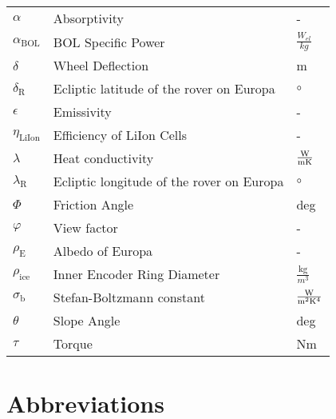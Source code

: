 \begin{longtable}[l]{lll}

$\alpha$				&	Absorptivity								& -  							\\
$\alpha_\text{BOL}$		&	BOL Specific Power							& $\frac{W_{el}}{kg}$			\\
\(\delta\)				&	Wheel Deflection							& m								\\
$\delta_\text{R}$		&	Ecliptic latitude of the rover on Europa	& $\circ$						\\
\(\epsilon\)			&	Emissivity 									&	-							\\
$\eta_\text{LiIon}$		&	Efficiency of LiIon Cells					& -								\\
$\lambda$				&	Heat conductivity							& $\frac{{\rm W}}{{\rm m} {\rm K}}$			\\
$\lambda_\text{R}$		&	Ecliptic longitude of the rover on Europa	& $\circ$						\\
\(\Phi\)				&	Friction Angle								& deg							\\
$\varphi$				&	View factor									& -								\\
\(\rho_\text{E}\)		&	Albedo of Europa			  				& -								\\
\(\rho_\text{ice}\)		&	Inner Encoder Ring Diameter  				&	\(\frac{\text{kg}}{m^3}\)	\\
$\sigma_\text{b}$ 		&	Stefan-Boltzmann constant					& $\frac{{\rm W}}{{\rm m}^2{\rm K}^4}$ 		\\
\(\theta\)				&	Slope Angle									& deg							\\
\(\tau\)				&	Torque										& Nm							\\




\end{longtable}

\chapter*{Abbreviations}


